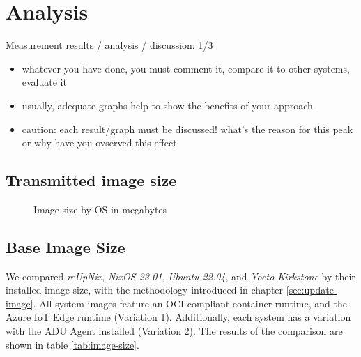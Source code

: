 \chapter{Analysis}

Measurement results / analysis / discussion: 1/3

\begin{itemize}
\item whatever you have done, you must comment it, compare it to other systems, evaluate it
\item usually, adequate graphs help to show the benefits of your approach
\item caution: each result/graph must be discussed! what's the reason for this peak or why have you ovserved this effect
\end{itemize}

\section{Transmitted image size}
\begin{figure}[H]
\centering
{}
\caption{Image size by OS in megabytes}
\end{figure}
\clearpage
\section{Base Image Size}
We compared \textit{reUpNix}, \textit{NixOS 23.01}, \textit{Ubuntu 22.04}, and
\textit{Yocto Kirkstone} by their installed image size, with the methodology introduced
in chapter \ref{sec:update-image}. All system images feature an \ac{OCI}-compliant container runtime,
and the Azure IoT Edge runtime (Variation 1). Additionally, each system has a
variation with the \ac{ADU} Agent installed (Variation 2). The results of the
comparison are shown in table \ref{tab:image-size}.

